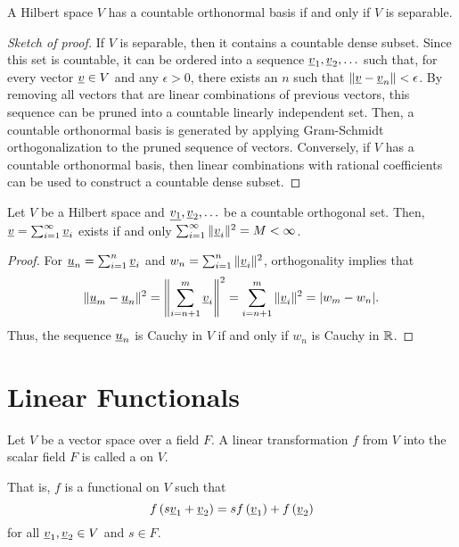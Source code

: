 \begin{theorem} \label{theorem:SeparableHilbertSpace}
A Hilbert space $V$ has a countable orthonormal basis if and only if $V$ is separable.
\end{theorem}
\begin{proof}[Sketch of proof]
If $V$ is separable, then it contains a countable dense subset.
Since this set is countable, it can be ordered into a sequence $\underline{v}_1 , \underline{v}_2 , \ldots$ such that, for every vector $\underline{v}\in V$ and any $\epsilon>0$, there exists an $n$ such that $\left\| \underline{v} - \underline{v}_n \right\| < \epsilon$.
By removing all vectors that are linear combinations of previous vectors, this sequence can be pruned into a countable linearly independent set.
Then, a countable orthonormal basis is generated by applying Gram-Schmidt orthogonalization to the pruned sequence of vectors.
Conversely, if $V$ has a countable orthonormal basis, then linear combinations with rational coefficients can be used to construct a countable dense subset.
\end{proof}

\begin{lemma} \label{lem:hilbert_sum_convergence}
Let $V$ be a Hilbert space and $\underline{v_1},\underline{v}_2,\ldots$ be a countable orthogonal set.
Then, $\underline{v} = \sum_{i=1}^\infty \underline{v}_i$ exists if and only $\sum_{i=1}^\infty \|\underline{v}_i\|^2 = M < \infty$.
\end{lemma}
\begin{proof}
For $\underline{u}_n = \sum_{i=1}^n \underline{v}_i$ and $w_n = \sum_{i=1}^n \|\underline{v}_i\|^2$, orthogonality implies that
\[\|\underline{u}_m - \underline{u}_n\|^2 = \left\| \sum_{i=n+1}^m \underline{v}_i \right\|^2 = \sum_{i=n+1}^m \|\underline{v}_i \|^2 = | w_m - w_n|. \]
Thus, the sequence $\underline{u}_n$ is Cauchy in $V$ if and only if $w_n$ is Cauchy in $\mathbb{R}$.
\end{proof}


\section{Linear Functionals}

\begin{definition}
Let $V$ be a vector space over a field $F$.
A linear transformation $f$ from $V$ into the scalar field $F$ is called a  on $V$.
\end{definition}
That is, $f$ is a functional on $V$ such that
\begin{equation*}
f \left( s \underline{v}_1 + \underline{v}_2 \right)
= s f \left( \underline{v}_1 \right) + f \left( \underline{v}_2 \right)
\end{equation*}
for all $\underline{v}_1, \underline{v}_2 \in V$ and $s \in F$.

